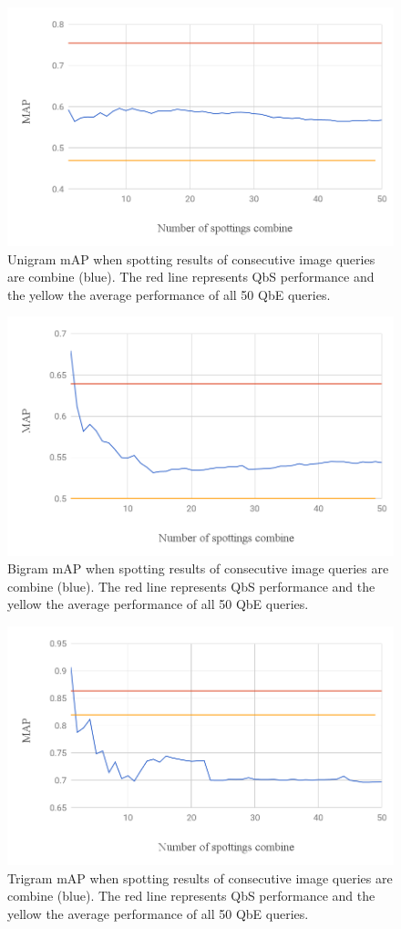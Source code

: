 \documentclass[ms,electronic,twosidetoc,letterpaper,chaptercenter,parttop,lof,lot]{byumsphd}
\begin{document}
\begin{figure}
    \centering
    \includegraphics[width=.75\textwidth]{unigram_respot_chart}
    \caption{Unigram mAP when spotting results of consecutive image queries are combine (blue). The red line represents QbS performance and the yellow the average performance of all 50 QbE queries.}
    \label{fig:unigram_respot}
\end{figure}
\begin{figure}
    \centering
    \includegraphics[width=.75\textwidth]{bigram_respot_chart}
    \caption{Bigram mAP when spotting results of consecutive image queries are combine (blue). The red line represents QbS performance and the yellow the average performance of all 50 QbE queries.}
    \label{fig:bigram_respot}
\end{figure}
\begin{figure}
    \centering
    \includegraphics[width=.75\textwidth]{trigram_respot_chart}
    \caption{Trigram mAP when spotting results of consecutive image queries are combine (blue). The red line represents QbS performance and the yellow the average performance of all 50 QbE queries.}
    \label{fig:trigram_respot}
\end{figure}
\end{document}

